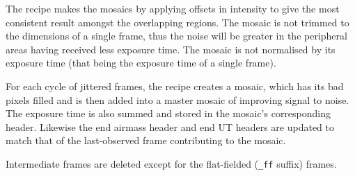 \documentclass[twoside,11pt,nolof]{starlink}
\begin{document}
{{{         \sstitem
         The recipe makes the mosaics by applying offsets in intensity
         to give the most consistent result amongst the overlapping regions.
         The mosaic is not trimmed to the dimensions of a single frame, thus
         the noise will be greater in the peripheral areas having received
         less exposure time.  The mosaic is not normalised by its exposure
         time (that being the exposure time of a single frame).

         \sstitem
         For each cycle of jittered frames, the recipe creates a mosaic,
         which has its bad pixels filled and is then added into a master
         mosaic of improving signal to noise.  The exposure time is also
         summed and stored in the mosaic's corresponding header.
	 Likewise the end airmass header and end UT headers are
	 updated to match that of the last-observed frame contributing
	 to the mosaic.

         \sstitem
         Intermediate frames are deleted except for the flat-fielded ({\tt\_ff}
         suffix) frames.
      }
   }
   }
\end{document}
